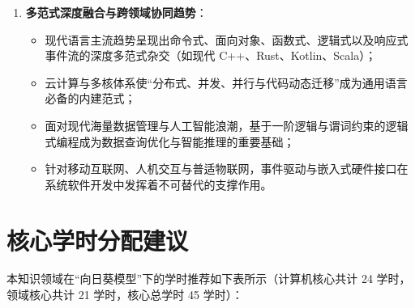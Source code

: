 \begin{preamblebox}[知识领域概述与变革]
\begin{enumerate}
\begin{itemize}
        \item \textbf{形式化开发方法学}：涵盖交互式定理证明器、模型检验与程序验证；
        \item \textbf{嵌入式计算与硬件接口}：面向边缘计算与异构加速硬件的语言接口；
        \item \textbf{编程语言基础与社会、伦理及专业素养}：探讨英语中心主义、代码可访问性、神经多样性与技术术语包容性演进。
    \end{itemize}
    \item \textbf{多范式深度融合与跨领域协同趋势}：
    \begin{itemize}
        \item 现代语言主流趋势呈现出命令式、面向对象、函数式、逻辑式以及响应式事件流的深度多范式杂交（如现代 C++、Rust、Kotlin、Scala）；
        \item 云计算与多核体系使“分布式、并发、并行与代码动态迁移”成为通用语言必备的内建范式；
        \item 面对现代海量数据管理与人工智能浪潮，基于一阶逻辑与谓词约束的逻辑式编程成为数据查询优化与智能推理的重要基础；
        \item 针对移动互联网、人机交互与普适物联网，事件驱动与嵌入式硬件接口在系统软件开发中发挥着不可替代的支撑作用。
    \end{itemize}
\end{enumerate}
\end{preamblebox}

\section{核心学时分配建议}

本知识领域在“向日葵模型”下的学时推荐如下表所示（计算机核心共计 24 学时，领域核心共计 21 学时，核心总学时 45 学时）：

